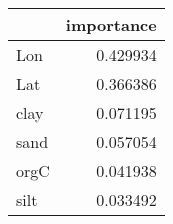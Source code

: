 \begin{tabular}{lr}
\toprule
 & importance \\
\midrule
Lon & 0.429934 \\
Lat & 0.366386 \\
clay & 0.071195 \\
sand & 0.057054 \\
orgC & 0.041938 \\
silt & 0.033492 \\
\bottomrule
\end{tabular}
